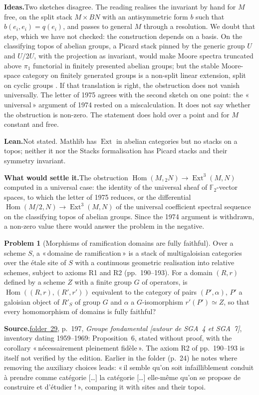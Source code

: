 \documentclass[11pt]{article}
\newcommand{\q}[1]{«\,#1\,»}
\newcommand{\fac}[1]{\href{https://grothendieck.umontpellier.fr/#1.pdf}{folder~#1}}
\newcommand{\Ext}{\operatorname{Ext}}
\theoremstyle{definition}
\newtheorem{problem}{Problem}
\theoremstyle{plain}\newtheorem*{proposition}{Proposition}\theoremstyle{definition}
\newcommand{\entry}[1]{\par\medskip\noindent\textbf{#1}\enspace}
\newcommand{\src}[1]{\entry{Source.}#1}
\newcommand{\ideas}{\entry{Ideas.}}
\newcommand{\leanst}{\entry{Lean.}}
\newcommand{\settle}{\entry{What would settle it.}}
\begin{document}
\ideas Two sketches disagree. The reading realises the invariant by hand for $M$ free, on the split stack $M \times BN$ with an antisymmetric form $b$ such that $b(e_i, e_i) = q(e_i)$, and passes to general $M$ through a resolution. We doubt that step, which we have not checked: the construction depends on a basis. On the classifying topos of abelian groups, a Picard stack pinned by the generic group $U$ and $U/2U$, with the projection as invariant, would make Moore spectra truncated above $\pi_1$ functorial in finitely presented abelian groups; but the stable Moore-space category on finitely generated groups is a non-split linear extension, split on cyclic groups \cite[Rem.~1.5.5]{baues}. If that translation is right, the obstruction does not vanish universally. The letter of 1975 agrees with the second sketch on one point: the \q{universal} argument of 1974 rested on a miscalculation. It does not say whether the obstruction is non-zero. The statement does hold over a point and for $M$ constant and free.

\leanst Not stated. Mathlib has $\Ext$ in abelian categories but no stacks on a topos; neither it nor the Stacks formalisation \cite{axiomstacks} has Picard stacks and their symmetry invariant.

\settle The obstruction $\operatorname{Hom}(M, {}_2N) \to \Ext^3(M, N)$ computed in a universal case: the identity of the universal sheaf of $\mathbb F_2$-vector spaces, to which the letter of 1975 reduces, or the differential $\operatorname{Hom}(M/2, N) \to \Ext^3(M, N)$ of the universal coefficient spectral sequence on the classifying topos of abelian groups. Since the 1974 argument is withdrawn, a non-zero value there would answer the problem in the negative.

\begin{problem}[Morphisms of ramification domains are fully faithful]\label{p:domram}
Over a scheme $S$, a \q{domaine de ramification} is a stack of multigaloisian categories over the étale site of $S$ with a continuous geometric realisation into relative schemes, subject to axioms R1 and R2 (pp.~190--193). For a domain $(R, r)$ defined by a scheme $Z$ with a finite group $G$ of operators, is $\operatorname{Hom}((R, r), (R', r'))$ equivalent to the category of pairs $(P', \alpha)$, $P'$ a galoisian object of $R'_S$ of group $G$ and $\alpha$ a $G$-isomorphism $r'(P') \simeq Z$, so that every homomorphism of domains is fully faithful?
\end{problem}

\src{\fac{29}, p.~197, \emph{Groupe fondamental [autour de SGA~4 et SGA~7]}, inventory dating 1959--1969: Proposition~6, stated without proof, with the corollary \q{nécessairement pleinement fidèle}. The axiom R2 of pp.~190--193 is itself not verified by the edition. Earlier in the folder (p.~24) he notes where removing the auxiliary choices leads: \q{il semble qu'on soit infailliblement conduit à prendre comme catégorie [\dots] la catégorie [\dots] elle-même qu'on se propose de construire et d'étudier !}, comparing it with sites and their topoi.}
\end{document}

